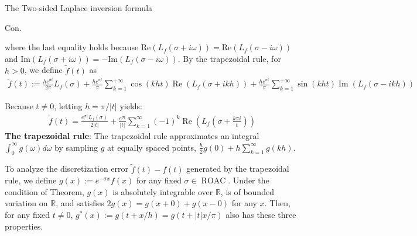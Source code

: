 \documentclass{beamer}
\begin{document}
\begin{frame}{The Two-sided Laplace inversion formula}


    {\footnotesize \scriptsize
    \par Con.
    \par where the last equality holds because \( \text{Re}(L_f(\sigma + i\omega)) 
    = \text{Re}(L_f(\sigma - i\omega)) \) and \( \text{Im}(L_f(\sigma + i\omega)) = -\text{Im}(L_f(\sigma - i\omega)) \). 
    By the trapezoidal rule, for \( h > 0 \), we define \(\tilde{f}(t)\) as
    \begin{align*}
        \tilde{f}(t) := \frac{he^{\sigma t}}{2\pi} L_f(\sigma) + \frac{he^{\sigma t}}{\pi} \sum_{k=1}^{+\infty} 
        \cos(kht) \operatorname{Re}(L_f(\sigma + ikh)) 
        + \frac{he^{\sigma t}}{\pi} \sum_{k=1}^{+\infty} \sin(kht) \operatorname{Im}(L_f(\sigma - ikh))
    \end{align*}
    \par Because \( t \neq 0 \), letting \( h = \pi / |t| \) yields:
    \begin{align*}
        \tilde{f}(t) = \frac{e^{\sigma t} L_f(\sigma)}{2|t|} + 
        \frac{e^{\sigma t}}{|t|} \sum_{k=1}^{\infty} (-1)^k \operatorname{Re} \left( L_f \left( \sigma + \frac{k\pi i}{t} \right) \right)
    \end{align*}
    \textbf{The trapezoidal rule}: The trapezoidal rule approximates an integral $\int_{0}^{\infty} g(\omega)  d\omega$ 
    by sampling \( g \) at equally spaced points, $\frac{h}{2} g(0) + h \sum_{k=1}^{\infty} g(kh).$  
    \par To analyze the discretization error \(\tilde{f}(t) - f(t)\) generated by
     the trapezoidal rule, we define \( g(x) := e^{-\sigma x} f(x) \) for any fixed \(\sigma \in \operatorname{ROAC}\). 
     Under the condition of Theorem, \( g(x) \) is absolutely integrable over \(\mathbb{R}\), is of bounded variation on \(\mathbb{R}\), 
     and satisfies \( 2g(x) = g(x+0) + g(x-0) \) for any \( x \).
      Then, for any fixed \( t \neq 0 \), \( g^*(x) := g(t + x/h) = g(t + |t| x/\pi) \) also has these three properties. 
    }
    
\end{frame}
\end{document}
